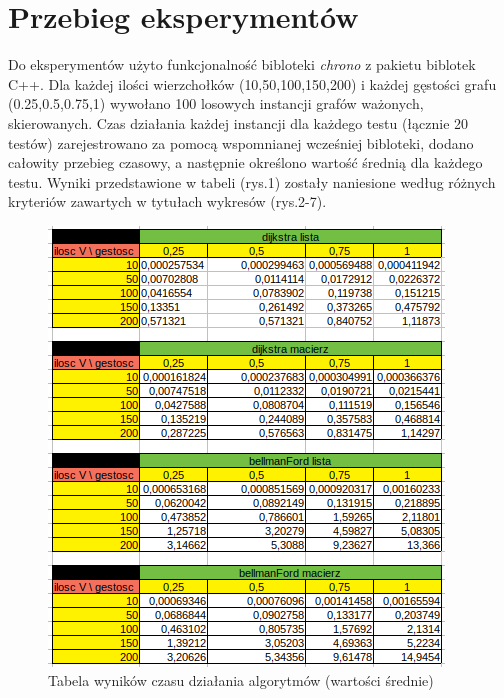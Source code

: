 \documentclass[10pt,a4paper]{article} %
\begin{document}
	\section{Przebieg eksperymentów}
	Do eksperymentów użyto funkcjonalność bibloteki \textit{chrono} z pakietu biblotek C++. Dla każdej ilości wierzchołków (10,50,100,150,200) i każdej gęstości grafu (0.25,0.5,0.75,1) wywołano 100 losowych instancji grafów ważonych, skierowanych. Czas działania każdej instancji dla każdego testu (łącznie 20 testów) zarejestrowano za pomocą wspomnianej wcześniej bibloteki, dodano całowity przebieg czasowy, a następnie określono wartość średnią dla każdego testu. Wyniki przedstawione w tabeli (rys.1) zostały naniesione według różnych kryteriów zawartych w tytułach wykresów (rys.2-7).
	\begin{figure}[!ht]
		\centering %
		\includegraphics[scale = 0.9]{tabela.png} %
		\caption{Tabela wyników czasu działania algorytmów (wartości średnie)} %
		\label{fig:Obraz1} %
	\end{figure}

	\clearpage
	
\end{document}
